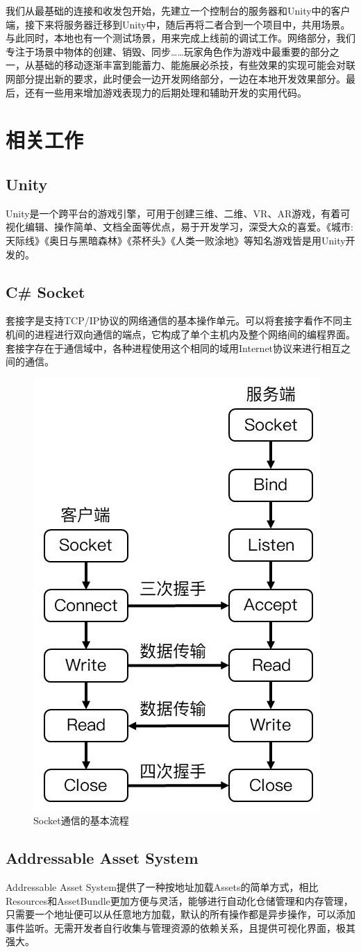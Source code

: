 \documentclass[conference]{IEEEtran}
\begin{document}
我们从最基础的连接和收发包开始，先建立一个控制台的服务器和Unity中的客户端，接下来将服务器迁移到Unity中，随后再将二者合到一个项目中，共用场景。与此同时，本地也有一个测试场景，用来完成上线前的调试工作。网络部分，我们专注于场景中物体的创建、销毁、同步……玩家角色作为游戏中最重要的部分之一，从基础的移动逐渐丰富到能蓄力、能施展必杀技，有些效果的实现可能会对联网部分提出新的要求，此时便会一边开发网络部分，一边在本地开发效果部分。最后，还有一些用来增加游戏表现力的后期处理和辅助开发的实用代码。


\section{相关工作}
\subsection{Unity}
Unity是一个跨平台的游戏引擎，可用于创建三维、二维、VR、AR游戏，有着可视化编辑、操作简单、文档全面等优点，易于开发学习，深受大众的喜爱。《城市:天际线》《奥日与黑暗森林》《茶杯头》《人类一败涂地》等知名游戏皆是用Unity开发的。

\subsection{C\# Socket}
套接字是支持TCP/IP协议的网络通信的基本操作单元。可以将套接字看作不同主机间的进程进行双向通信的端点，它构成了单个主机内及整个网络间的编程界面。套接字存在于通信域中，各种进程使用这个相同的域用Internet协议来进行相互之间的通信。\cite{Unity3D网络游戏实战}

\begin{figure}[htbp]
    \centerline{\includegraphics[width=.22\textwidth]{images/Socket通信的基本流程.jpg}}
    \caption{Socket通信的基本流程}
    \label{fig:socket}
\end{figure}


\subsection{Addressable Asset System}
Addressable Asset System提供了一种按地址加载Assets的简单方式，相比Resources和AssetBundle更加方便与灵活，能够进行自动化仓储管理和内存管理，只需要一个地址便可以从任意地方加载，默认的所有操作都是异步操作，可以添加事件监听。无需开发者自行收集与管理资源的依赖关系，且提供可视化界面，极其强大。
\end{document}
